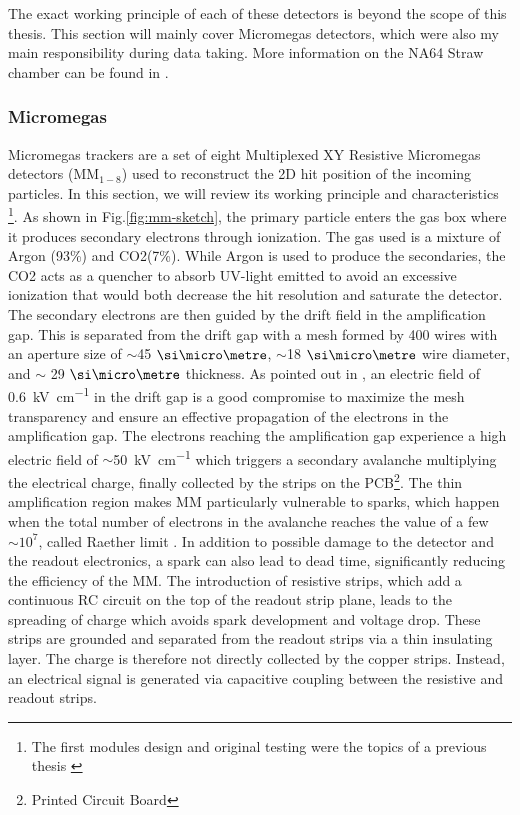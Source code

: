 The exact working principle of each of these detectors is beyond the scope of this thesis. This section will mainly cover Micromegas detectors, which were also my main responsibility during data taking. More information on the NA64 Straw chamber can be found in \cite{pdegen-thesis}.

\subsubsection{Micromegas}

Micromegas trackers are a set of eight Multiplexed XY Resistive Micromegas detectors (MM$_{1-8}$) used to reconstruct the 2D hit position of the incoming particles. In this section, we will review its working principle and characteristics \footnote{The first modules design and original testing were the topics of a previous thesis \cite{dbanerjee-thesis}}.
As shown in Fig.\ref{fig:mm-sketch}, the primary particle enters the gas box where it produces secondary electrons through ionization. The gas used is a mixture of Argon (93\%) and CO2(7\%). While Argon is used to produce the secondaries, the CO2 acts as a quencher to absorb UV-light emitted to avoid an excessive ionization that would both decrease the hit resolution and saturate the detector. The secondary electrons are then guided by the drift field in the amplification gap. This is separated from the drift gap with a mesh formed by 400 wires with an aperture size of $\sim$45 $\mum$, $\sim$18 $\mum$ wire diameter, and $\sim$ 29 $\mum$ thickness. As pointed out in \cite{Bortfeldt:2014vvt}, an electric field of \SI{0.6}{\kilo\volt\per\centi\metre} in the drift gap is a good compromise to maximize the mesh transparency and ensure an effective propagation of the electrons in the amplification gap. The electrons reaching the amplification gap experience a high electric field of $\sim$\SI{50}{\kilo\volt\per\centi\metre} which triggers a secondary avalanche multiplying the electrical charge, finally collected by the strips on the PCB\footnote{Printed Circuit Board}.
The thin amplification region makes MM particularly vulnerable to sparks, which happen when the total number of electrons in the avalanche reaches the value of a few $\sim 10^7$, called Raether limit \cite{BAY2002162,BRESSAN1999321,Raether:102989}. In addition to possible damage to the detector and the readout electronics, a spark can also lead to dead time, significantly reducing the efficiency of the MM. The introduction of resistive strips, which add a continuous RC circuit on the top of the readout strip plane, leads to the spreading of charge which avoids spark development and voltage drop. These strips are grounded and separated from the readout strips via a thin insulating layer. The charge is therefore not directly collected by the copper strips. Instead, an electrical signal is generated via capacitive coupling between the resistive and readout strips.


